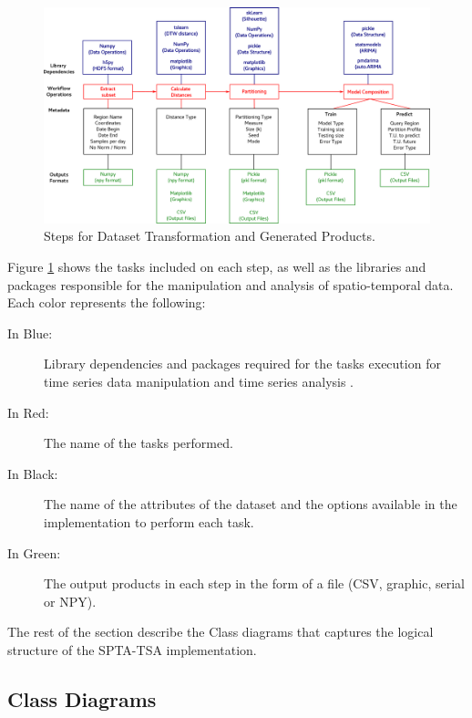 \begin{figure}[tp]
	\centering
	\includegraphics[scale=0.25, angle=90]{../Figures/workflow_data_operations}
	\caption{Steps for Dataset Transformation and Generated Products.}	
	\label{Fig:Steps-Data-Transformation}	 		
\end{figure}

Figure \ref{Fig:Steps-Data-Transformation} shows the tasks included on each step, as well as the libraries and packages responsible for the manipulation and analysis of spatio-temporal data. Each color represents the following:

\begin{description}
    \item[In Blue:] Library dependencies and packages required for the tasks execution for time series data manipulation and time series analysis .
    \item[In Red:] The name of the tasks performed.
    \item[In Black:] The name of the attributes of the dataset and the options available in the implementation to perform each task.
    \item[In Green:] The output products in each step in the form of a file (CSV, graphic, serial or NPY).
\end{description}

The rest of the section describe the Class diagrams that captures the logical structure of the SPTA-TSA implementation.

\subsection{Class Diagrams}
\label{Sec:SPT-TSAClassDiagrams}

